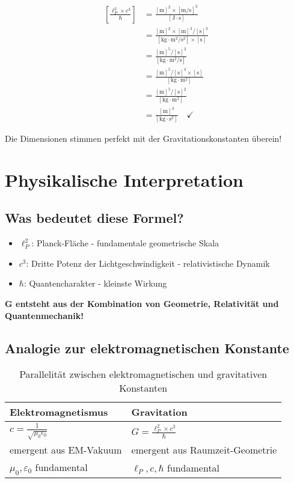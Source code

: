 \documentclass[12pt,a4paper]{article}
\theoremstyle{definition}
\begin{document}
	\begin{align}
		\left[\frac{\ell_P^2 \times c^3}{\hbar}\right] &= \frac{[\text{m}]^2 \times [\text{m}/\text{s}]^3}{[\text{J} \cdot \text{s}]} \\
		&= \frac{[\text{m}]^2 \times [\text{m}]^3/[\text{s}]^3}{[\text{kg} \cdot \text{m}^2/\text{s}^2] \times [\text{s}]} \\
		&= \frac{[\text{m}]^5/[\text{s}]^3}{[\text{kg} \cdot \text{m}^2/\text{s}]} \\
		&= \frac{[\text{m}]^5/[\text{s}]^3 \times [\text{s}]}{[\text{kg} \cdot \text{m}^2]} \\
		&= \frac{[\text{m}]^5/[\text{s}]^2}{[\text{kg} \cdot \text{m}^2]} \\
		&= \frac{[\text{m}]^3}{[\text{kg} \cdot \text{s}^2]} \quad \checkmark
	\end{align}
	
	Die Dimensionen stimmen perfekt mit der Gravitationskonstanten überein!
	
	\section{Physikalische Interpretation}
	
	\subsection{Was bedeutet diese Formel?}
	
	\begin{itemize}
		\item \textbf{$\ell_P^2$}: Planck-Fläche - fundamentale geometrische Skala
		\item \textbf{$c^3$}: Dritte Potenz der Lichtgeschwindigkeit - relativistische Dynamik
		\item \textbf{$\hbar$}: Quantencharakter - kleinste Wirkung
	\end{itemize}
	
	\textbf{G entsteht aus der Kombination von Geometrie, Relativität und Quantenmechanik!}
	
	\subsection{Analogie zur elektromagnetischen Konstante}
	
	\begin{table}[h]
		\centering
		\begin{tabular}{ll}
			\toprule
			\textbf{Elektromagnetismus} & \textbf{Gravitation} \\
			\midrule
			$c = \frac{1}{\sqrt{\mu_0\varepsilon_0}}$ & $G = \frac{\ell_P^2 \times c^3}{\hbar}$ \\
			emergent aus EM-Vakuum & emergent aus Raumzeit-Geometrie \\
			$\mu_0, \varepsilon_0$ fundamental & $\ell_P, c, \hbar$ fundamental \\
			\bottomrule
		\end{tabular}
		\caption{Parallelität zwischen elektromagnetischen und gravitativen Konstanten}
	\end{table}
	
\end{document}
